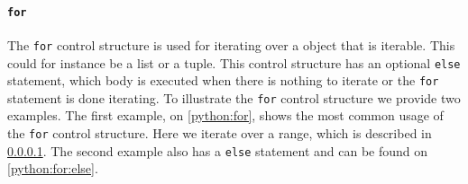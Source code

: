 \paragraph{\texttt{for}}
The \texttt{for} control structure is used for iterating over a object that is iterable.
This could for instance be a list or a tuple.
This control structure has an optional \texttt{else} statement, which body is executed when there is nothing to iterate or the \texttt{for} statement is done iterating.
To illustrate the \texttt{for} control structure we provide two examples.
The first example, on \cref{python:for}, shows the most common usage of the \texttt{for} control structure.
Here we iterate over a range, which is described in \cref{}. 
The second example also has a \texttt{else} statement and can be found on \cref{python:for:else}.


